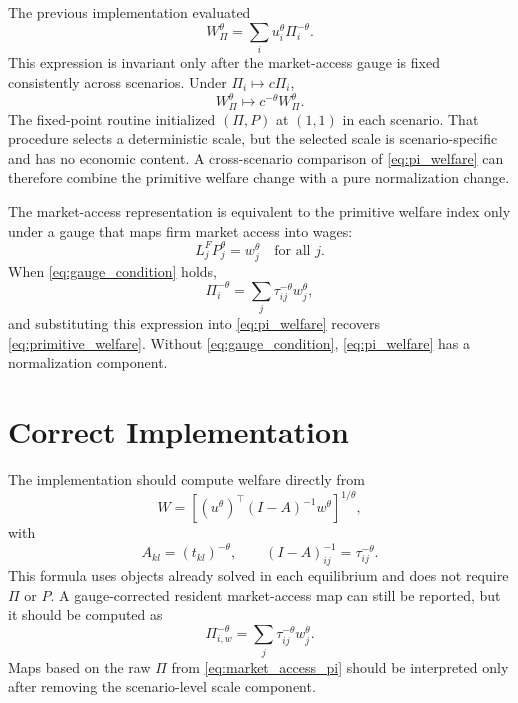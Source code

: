 \documentclass[11pt]{article}
\begin{document}
The previous implementation evaluated
\begin{equation}
\label{eq:pi_welfare}
    W_\Pi^\theta = \sum_i u_i^\theta \Pi_i^{-\theta}.
\end{equation}
This expression is invariant only after the market-access gauge is fixed consistently across scenarios. Under $\Pi_i \mapsto c\Pi_i$,
\[
    W_\Pi^\theta \mapsto c^{-\theta}W_\Pi^\theta.
\]
The fixed-point routine initialized $(\Pi,P)$ at $(1,1)$ in each scenario. That procedure selects a deterministic scale, but the selected scale is scenario-specific and has no economic content. A cross-scenario comparison of \eqref{eq:pi_welfare} can therefore combine the primitive welfare change with a pure normalization change.

The market-access representation is equivalent to the primitive welfare index only under a gauge that maps firm market access into wages:
\begin{equation}
\label{eq:gauge_condition}
    L_j^F P_j^\theta = w_j^\theta
    \quad \text{for all } j.
\end{equation}
When \eqref{eq:gauge_condition} holds,
\[
    \Pi_i^{-\theta}
    =
    \sum_j \tau_{ij}^{-\theta} w_j^\theta ,
\]
and substituting this expression into \eqref{eq:pi_welfare} recovers \eqref{eq:primitive_welfare}. Without \eqref{eq:gauge_condition}, \eqref{eq:pi_welfare} has a normalization component.

\section{Correct Implementation}

The implementation should compute welfare directly from
\begin{equation}
\label{eq:implemented_welfare}
    W
    =
    \left[
    (u^\theta)^\top
    (I-A)^{-1}
    w^\theta
    \right]^{1/\theta},
\end{equation}
with
\[
    A_{kl} = (t_{kl})^{-\theta},
    \qquad
    (I-A)^{-1}_{ij} = \tau_{ij}^{-\theta}.
\]
This formula uses objects already solved in each equilibrium and does not require $\Pi$ or $P$. A gauge-corrected resident market-access map can still be reported, but it should be computed as
\begin{equation}
\label{eq:gauge_free_pi}
    \Pi_{i,w}^{-\theta}
    =
    \sum_j \tau_{ij}^{-\theta} w_j^\theta .
\end{equation}
Maps based on the raw $\Pi$ from \eqref{eq:market_access_pi} should be interpreted only after removing the scenario-level scale component.
\end{document}
